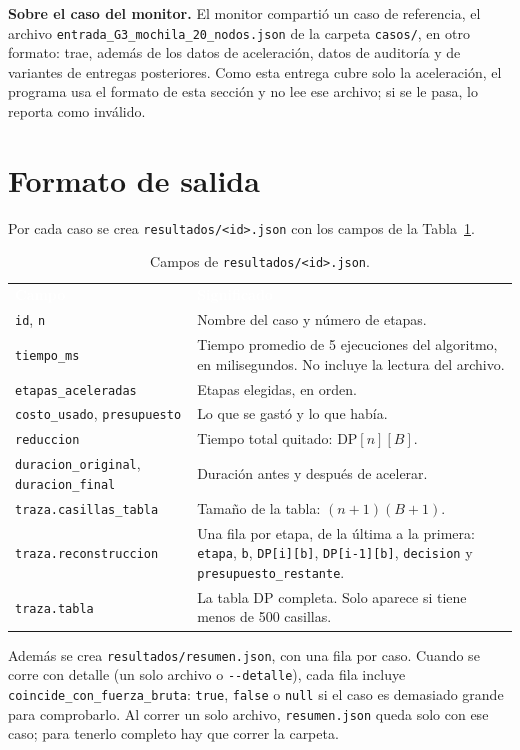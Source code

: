 \documentclass[11pt,a4paper]{article}
\newcommand{\cod}[1]{\texttt{#1}}
\newcommand{\DP}[2]{\mathrm{DP}[#1][#2]}
\newcommand{\encabezado}{\rowcolor{fondo}}
\newcommand{\blanco}[1]{\textcolor{white}{\textbf{#1}}}
\begin{document}
\textbf{Sobre el caso del monitor.} El monitor compartió un caso de referencia, el archivo \cod{entrada\_G3\_mochila\_20\_nodos.json} de la carpeta \cod{casos/}, en otro formato: trae, además de los datos de aceleración, datos de auditoría y de variantes de entregas posteriores. Como esta entrega cubre solo la aceleración, el programa usa el formato de esta sección y no lee ese archivo; si se le pasa, lo reporta como inválido.

\section{Formato de salida}
\label{sec:salida}

Por cada caso se crea \cod{resultados/<id>.json} con los campos de la Tabla~\ref{tab:salida}.

\begin{table}[H]
\centering\small
\renewcommand{\arraystretch}{1.2}
\begin{tabularx}{\textwidth}{@{}lX@{}}
\encabezado \blanco{Campo} & \blanco{Significado} \\
\cod{id}, \cod{n} & Nombre del caso y número de etapas. \\
\cod{tiempo\_ms} & Tiempo promedio de 5 ejecuciones del algoritmo, en milisegundos. No incluye la lectura del archivo. \\
\cod{etapas\_aceleradas} & Etapas elegidas, en orden. \\
\cod{costo\_usado}, \cod{presupuesto} & Lo que se gastó y lo que había. \\
\cod{reduccion} & Tiempo total quitado: $\DP{n}{B}$. \\
\cod{duracion\_original}, \cod{duracion\_final} & Duración antes y después de acelerar. \\
\cod{traza.casillas\_tabla} & Tamaño de la tabla: $(n+1)(B+1)$. \\
\cod{traza.reconstruccion} & Una fila por etapa, de la última a la primera: \cod{etapa}, \cod{b}, \cod{DP[i][b]}, \cod{DP[i-1][b]}, \cod{decision} y \cod{presupuesto\_restante}. \\
\cod{traza.tabla} & La tabla DP completa. Solo aparece si tiene menos de 500 casillas. \\
\bottomrule
\end{tabularx}
\caption{Campos de \cod{resultados/<id>.json}.}
\label{tab:salida}
\end{table}

Además se crea \cod{resultados/resumen.json}, con una fila por caso. Cuando se corre con detalle (un solo archivo o \cod{-{}-detalle}), cada fila incluye \cod{coincide\_con\_fuerza\_bruta}: \cod{true}, \cod{false} o \cod{null} si el caso es demasiado grande para comprobarlo. Al correr un solo archivo, \cod{resumen.json} queda solo con ese caso; para tenerlo completo hay que correr la carpeta.
\end{document}
